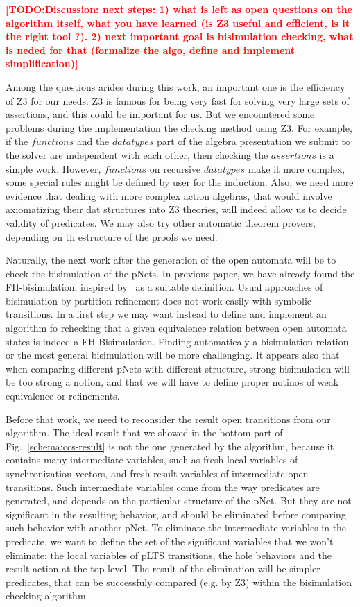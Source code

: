 \documentclass{lncs/llncs}
\newcommand{\TODO}[1]{\textcolor{red}{\textbf{[TODO:#1]}}}
\begin{document}
\TODO{Discussion: next steps: 1) what is left as open questions on the
  algorithm itself, what you have learned (is Z3 useful and efficient,
  is it the right tool ?). 2) next important goal is bisimulation
  checking, what is neded for that (formalize the algo, define and
  implement simplification)}

Among the questions arides during this work, an important one is the
efficiency of Z3 for our needs. Z3 is famous for being very fast for
solving very large sets of assertions, and this could be important for
us. But we encountered  some problems during the implementation the
checking method using Z3. For example, if the $functions$ and the
$datatypes$ part of the algebra presentation we submit to the solver
are independent with each other, then checking the $assertions$ is a
simple work. However, $functions$ on recursive $datatypes$ make it
more complex, some special rules might be defined by user for the
induction. Also, we need more evidence that dealing with more complex
action algebras, that would involve axiomatizing their dat structures
into Z3 theories, will indeed allow us to decide validity of
predicates.
We may also try other automatic theorem provers, depending on th
estructure of the proofs we need.

Naturally, the next work after the generation of the open automata
will be to check the bisimulation of the pNets. In previous paper, we
have already found the FH-bisimulation, inspired by~\cite{deSimone85} as a
suitable definition. Usual approaches of bisimulation by partition
refinement does not work easily with symbolic transitions. In a first
step we may want instead to define and implement an algorithm fo
rchecking that a given equivalence relation between open automata
states is indeed a FH-Bisimulation. Finding automaticaly a
bisimulation relation or the most general bisimulation will be more
challenging. It appears also that when comparing different pNets with
different structure, strong bisimulation will be too strong a notion,
and that we will have to define proper notinos of weak equivalence or
refinements. 

Before that work, we need to reconsider the result open transitions
from our algorithm. The ideal
result that we showed in the bottom part of
Fig.~\ref{schema:ccs-result} is not the one generated by the algorithm,
because it contains many intermediate
variables, such as fresh local variables of synchronization
vectors, and fresh result variables of intermediate open transitions.
Such intermediate variables come from the way predicates are
generated, and depends on the particular structure of the pNet. But
they are not significant in the resulting behavior, and should be
eliminated before comparing such behavior with another pNet.
To eliminate the intermediate variables in the predicate, we want to define
the set of the significant variables that we won't eliminate: the
local variables of pLTS transitions, the hole behaviors and the result
action at the top level.
The result of the elimination will be simpler predicates, that can be
successfuly compared (e.g. by Z3) within the bisimulation checking
algorithm.





% 


\end{document}
